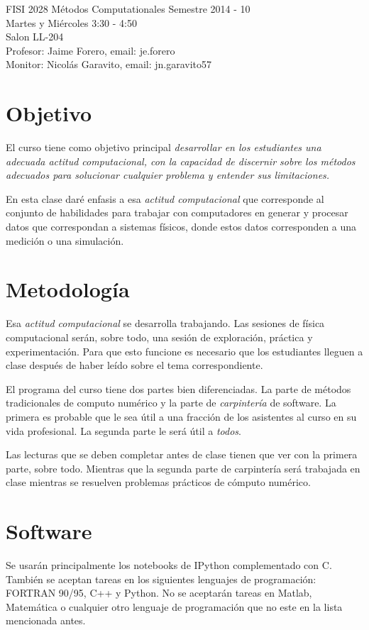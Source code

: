 \documentclass[11pt]{article}
\begin{document}
\noindent
FISI 2028 M\'etodos Computationales
Semestre 2014 - 10\\
Martes y Mi\'ercoles 3:30 - 4:50 \\
Salon LL-204\\
Profesor: Jaime Forero, email: je.forero\\
Monitor: Nicol\'as Garavito, email: jn.garavito57\\



\section*{Objetivo}
El curso tiene como objetivo principal \emph{desarrollar en los
  estudiantes una adecuada actitud computacional, con la capacidad de
  discernir sobre los m\'etodos adecuados para solucionar cualquier
  problema y entender sus limitaciones.} 
 
En esta clase dar\'e enfasis a esa \emph{actitud computacional} que
corresponde al conjunto de habilidades para trabajar con computadores
en generar y procesar datos que correspondan a sistemas f\'isicos,
donde estos datos corresponden a una medici\'on o una simulaci\'on. 

\section*{Metodolog\'ia}
Esa \emph{actitud computacional} se desarrolla trabajando. Las
sesiones de f\'isica computacional ser\'an, sobre todo, una sesi\'on
de exploraci\'on, pr\'actica y experimentaci\'on. Para que esto
funcione es necesario que los estudiantes lleguen a clase despu\'es de
haber le\'ido sobre el tema correspondiente. 

El programa del curso tiene dos partes bien diferenciadas. La parte de
m\'etodos tradicionales de computo num\'erico y la parte de
\emph{carpinter\'ia} de software. La primera es probable que le sea
\'util a una fracci\'on de los asistentes al curso en su vida
profesional. La segunda parte le ser\'a \'util a \emph{todos}. 

Las lecturas que se deben completar antes de clase tienen que ver con
la primera parte, sobre todo. Mientras que la segunda parte de
carpinter\'ia ser\'a trabajada en clase mientras se resuelven
problemas pr\'acticos de c\'omputo num\'erico. 

\section*{Software}
\noindent Se usar\'an principalmente los notebooks de IPython
complementado con C. Tambi\'en se aceptan tareas en los siguientes
lenguajes de programaci\'on: FORTRAN 90/95, C++ y Python. No se
aceptar\'an tareas en Matlab, Matem\'atica o cualquier otro lenguaje
de programaci\'on que no este en la lista mencionada antes.  
\end{document}
